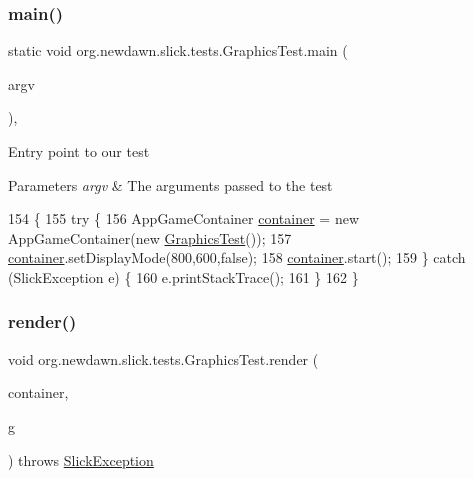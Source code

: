 \subsubsection{\texorpdfstring{main()}{main()}}
{\footnotesize\ttfamily static void org.\+newdawn.\+slick.\+tests.\+Graphics\+Test.\+main (\begin{DoxyParamCaption}\item[{String \mbox{[}$\,$\mbox{]}}]{argv }\end{DoxyParamCaption})\hspace{0.3cm}{\ttfamily [inline]}, {\ttfamily [static]}}

Entry point to our test


\begin{DoxyParams}{Parameters}
{\em argv} & The arguments passed to the test \\
\hline
\end{DoxyParams}

\begin{DoxyCode}
154                                            \{
155         \textcolor{keywordflow}{try} \{
156             AppGameContainer \mbox{\hyperlink{classorg_1_1newdawn_1_1slick_1_1tests_1_1_graphics_test_a5484b72803a02c8eba6188f08e274f32}{container}} = \textcolor{keyword}{new} AppGameContainer(\textcolor{keyword}{new} 
      \mbox{\hyperlink{classorg_1_1newdawn_1_1slick_1_1tests_1_1_graphics_test_abb433e8bd2e5a754719a759827e94029}{GraphicsTest}}());
157             \mbox{\hyperlink{classorg_1_1newdawn_1_1slick_1_1tests_1_1_graphics_test_a5484b72803a02c8eba6188f08e274f32}{container}}.setDisplayMode(800,600,\textcolor{keyword}{false});
158             \mbox{\hyperlink{classorg_1_1newdawn_1_1slick_1_1tests_1_1_graphics_test_a5484b72803a02c8eba6188f08e274f32}{container}}.start();
159         \} \textcolor{keywordflow}{catch} (SlickException e) \{
160             e.printStackTrace();
161         \}
162     \}
\end{DoxyCode}
\mbox{\label{classorg_1_1newdawn_1_1slick_1_1tests_1_1_graphics_test_a099b363f8b871ccc6da41e172c7ceeb6}} 
\subsubsection{\texorpdfstring{render()}{render()}}
{\footnotesize\ttfamily void org.\+newdawn.\+slick.\+tests.\+Graphics\+Test.\+render (\begin{DoxyParamCaption}\item[{\mbox{\hyperlink{classorg_1_1newdawn_1_1slick_1_1_game_container}{Game\+Container}}}]{container,  }\item[{\mbox{\hyperlink{classorg_1_1newdawn_1_1slick_1_1_graphics}{Graphics}}}]{g }\end{DoxyParamCaption}) throws \mbox{\hyperlink{classorg_1_1newdawn_1_1slick_1_1_slick_exception}{Slick\+Exception}}\hspace{0.3cm}{\ttfamily [inline]}}

